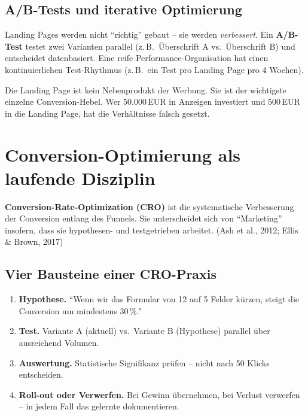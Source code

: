 \documentclass[11pt,a4paper,oneside]{article}
\newcommand{\fachbegriff}[1]{\textbf{#1}}
\newcommand{\quelle}[1]{{\footnotesize\color{lpGray}(#1)}}
\begin{document}
\subsection{A/B-Tests und iterative Optimierung}

Landing Pages werden nicht ``richtig'' gebaut -- sie werden \emph{verbessert}. Ein \fachbegriff{A/B-Test} testet zwei Varianten parallel (z.\,B.\ Überschrift A vs.\ Überschrift B) und entscheidet datenbasiert. Eine reife Performance-Organisation hat einen kontinuierlichen Test-Rhythmus (z.\,B.\ ein Test pro Landing Page pro 4 Wochen).

\begin{merkbox}
Die Landing Page ist kein Nebenprodukt der Werbung. Sie ist der wichtigste einzelne Conversion-Hebel. Wer 50.000\,EUR in Anzeigen investiert und 500\,EUR in die Landing Page, hat die Verhältnisse falsch gesetzt.
\end{merkbox}

\section{Conversion-Optimierung als laufende Disziplin}

\fachbegriff{Conversion-Rate-Optimization (CRO)} ist die systematische Verbesserung der Conversion entlang des Funnels. Sie unterscheidet sich von ``Marketing'' insofern, dass sie hypothesen- und testgetrieben arbeitet. \quelle{Ash et al., 2012; Ellis \& Brown, 2017}

\subsection{Vier Bausteine einer CRO-Praxis}

\begin{enumerate}
  \item \textbf{Hypothese.} ``Wenn wir das Formular von 12 auf 5 Felder kürzen, steigt die Conversion um mindestens 30\,\%.''
  \item \textbf{Test.} Variante A (aktuell) vs.\ Variante B (Hypothese) parallel über ausreichend Volumen.
  \item \textbf{Auswertung.} Statistische Signifikanz prüfen -- nicht nach 50 Klicks entscheiden.
  \item \textbf{Roll-out oder Verwerfen.} Bei Gewinn übernehmen, bei Verlust verwerfen -- in jedem Fall das gelernte dokumentieren.
\end{enumerate}
\end{document}

